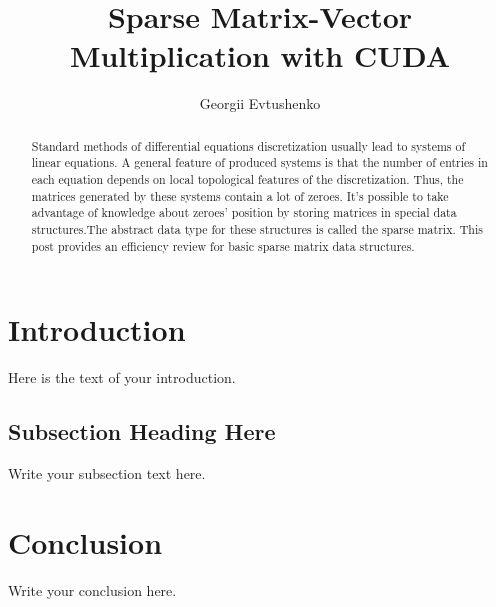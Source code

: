 \documentclass{article}
\begin{document}
\title{Sparse Matrix-Vector Multiplication with CUDA}
\author{Georgii Evtushenko}

\maketitle

\begin{abstract}
Standard methods of differential equations discretization usually lead to systems of linear equations. 
A general feature of produced systems is that the number of entries in each equation depends on local topological features of the discretization.
Thus, the matrices generated by these systems contain a lot of zeroes. It's possible to take advantage of knowledge about zeroes' position by 
storing matrices in special data structures.The abstract data type for these structures is called the sparse matrix. 
This post provides an efficiency review for basic sparse matrix data structures.
\end{abstract}

\section{Introduction}
Here is the text of your introduction.

\subsection{Subsection Heading Here}
Write your subsection text here.

\section{Conclusion}
Write your conclusion here.
\end{document}
